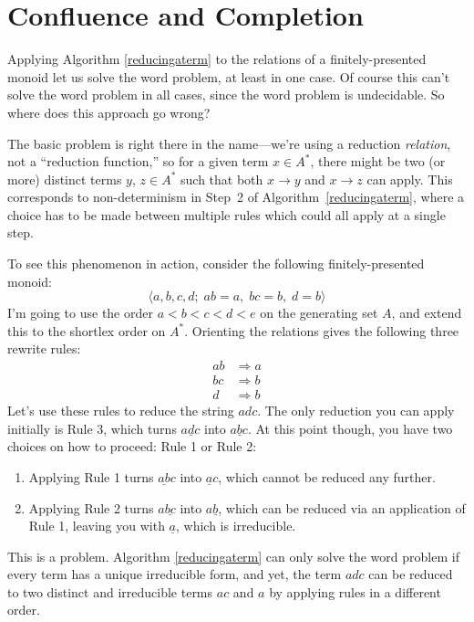 \documentclass[headsepline,bibliography=totoc]{scrreport}
\theoremstyle{definition}
\theoremstyle{definition}
\theoremstyle{definition}
\begin{document}
\section{Confluence and Completion}\label{confluenceandcompletion}
Applying Algorithm \ref{reducingaterm} to the relations of a finitely-presented monoid let us solve the word problem, at least in one case. Of course this can't solve the word problem in all cases, since the word problem is undecidable. So where does this approach go wrong?

The basic problem is right there in the name---we're using a reduction \emph{relation}, not a ``reduction function,'' so for a given term $x\in A^*$, there might be two (or more) distinct terms $y$, $z\in A^*$ such that both $x\rightarrow y$ and $x\rightarrow z$ can apply. This corresponds to non-determinism in Step~2 of Algorithm~\ref{reducingaterm}, where a choice has to be made between multiple rules which could all apply at a single step.

To see this phenomenon in action, consider the following finitely-presented monoid:
\[\langle a, b, c, d;\; ab=a,\; bc=b,\; d=b\rangle\]
I'm going to use the order $a<b<c<d<e$ on the generating set $A$, and extend this to the shortlex order on $A^*$. Orienting the relations gives the following three rewrite rules:
\begin{align}
ab&\Rightarrow a\tag{1}\\
bc&\Rightarrow b\tag{2}\\
d&\Rightarrow b\tag{3}
\end{align}
Let's use these rules to reduce the string $adc$. The only reduction you can apply initially is Rule 3, which turns $a\underline{d}c$ into $a\underline{b}c$. At this point though, you have two choices on how to proceed: Rule 1 or Rule 2:
\begin{enumerate}
\item Applying Rule 1 turns $\underline{ab}c$ into $\underline{a}c$, which cannot be reduced any further.
\item Applying Rule 2 turns $a\underline{bc}$ into $a\underline{b}$, which can be reduced via an application of Rule 1, leaving you with $\underline{a}$, which is irreducible.
\end{enumerate}
This is a problem. Algorithm \ref{reducingaterm} can only solve the word problem if every term has a unique irreducible form, and yet, the term $adc$ can be reduced to two distinct and irreducible terms $ac$ and $a$ by applying rules in a different order.
\end{document}
